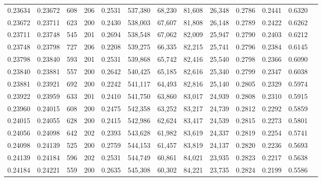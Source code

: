 \begin{tabular}{rrrrrrrrrrrrr}
0.23634 & 0.23672 &   608 & 206 &                                     0.2531 & 537,380 &  68,230 &  81,608 &  26,348 & 0.2786 & 0.2441 & 0.6320 \\
0.23672 & 0.23711 &   623 & 200 &                                     0.2430 & 538,003 &  67,607 &  81,808 &  26,148 & 0.2789 & 0.2422 & 0.6262 \\
0.23711 & 0.23748 &   545 & 201 &                                     0.2694 & 538,548 &  67,062 &  82,009 &  25,947 & 0.2790 & 0.2403 & 0.6212 \\
0.23748 & 0.23798 &   727 & 206 &                                     0.2208 & 539,275 &  66,335 &  82,215 &  25,741 & 0.2796 & 0.2384 & 0.6145 \\
0.23798 & 0.23840 &   593 & 201 &                                     0.2531 & 539,868 &  65,742 &  82,416 &  25,540 & 0.2798 & 0.2366 & 0.6090 \\
0.23840 & 0.23881 &   557 & 200 &                                     0.2642 & 540,425 &  65,185 &  82,616 &  25,340 & 0.2799 & 0.2347 & 0.6038 \\
0.23881 & 0.23921 &   692 & 200 &                                     0.2242 & 541,117 &  64,493 &  82,816 &  25,140 & 0.2805 & 0.2329 & 0.5974 \\
0.23922 & 0.23959 &   633 & 201 &                                     0.2410 & 541,750 &  63,860 &  83,017 &  24,939 & 0.2808 & 0.2310 & 0.5915 \\
0.23960 & 0.24015 &   608 & 200 &                                     0.2475 & 542,358 &  63,252 &  83,217 &  24,739 & 0.2812 & 0.2292 & 0.5859 \\
0.24015 & 0.24055 &   628 & 200 &                                     0.2415 & 542,986 &  62,624 &  83,417 &  24,539 & 0.2815 & 0.2273 & 0.5801 \\
0.24056 & 0.24098 &   642 & 202 &                                     0.2393 & 543,628 &  61,982 &  83,619 &  24,337 & 0.2819 & 0.2254 & 0.5741 \\
0.24098 & 0.24139 &   525 & 200 &                                     0.2759 & 544,153 &  61,457 &  83,819 &  24,137 & 0.2820 & 0.2236 & 0.5693 \\
0.24139 & 0.24184 &   596 & 202 &                                     0.2531 & 544,749 &  60,861 &  84,021 &  23,935 & 0.2823 & 0.2217 & 0.5638 \\
0.24184 & 0.24221 &   559 & 200 &                                     0.2635 & 545,308 &  60,302 &  84,221 &  23,735 & 0.2824 & 0.2199 & 0.5586 \\

\end{tabular}
